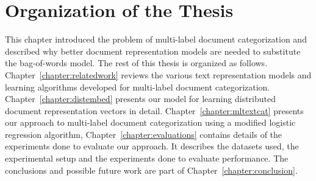 \section{Organization of the Thesis}
This chapter introduced the problem of multi-label document 
categorization and described why better document representation models 
are needed to substitute the bag-of-words model. The rest of this 
thesis is organized as follows. Chapter~\ref{chapter:relatedwork} 
reviews the various text representation models and learning algorithms 
developed for multi-label document categorization. 
Chapter~\ref{chapter:distembed} presents our model for learning 
distributed document representation vectors in detail. 
Chapter~\ref{chapter:mltextcat} presents our approach to multi-label 
document categorization using a modified logistic regression algorithm,
Chapter~\ref{chapter:evaluations} contains details of the experiments
done to evaluate our approach. It describes the 
datasets used, the experimental setup and the experiments done
to evaluate performance. The conclusions and 
possible future work are part of Chapter~\ref{chapter:conclusion}.







